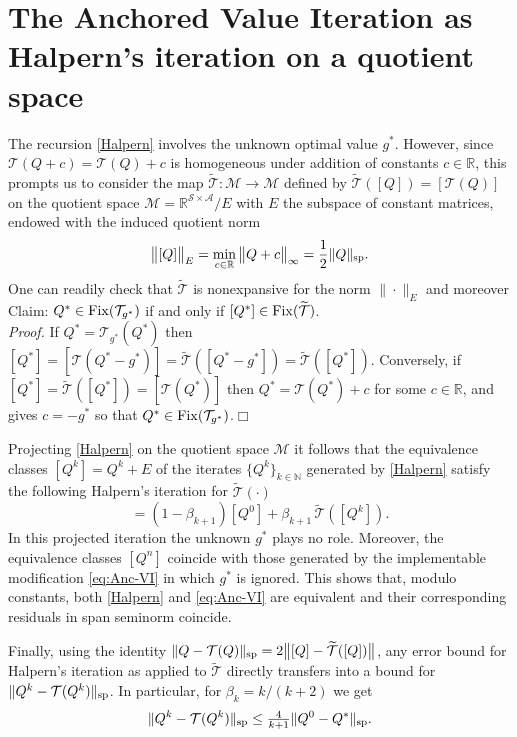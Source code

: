 \documentclass{article}
\newcommand{\cA}{\mathcal{A}}
\newcommand{\cS}{\mathcal{S}}
\newcommand{\T}{\mathcal{T}}
\newcommand{\NN}{\mathbb{N}}
\newcommand{\reals}{\mathbb{R}}
\renewcommand{\sp}[1]{\|{#1}\|_\text{\rm sp}}
\newcommand{\X}{\mathcal{M}}
\newcommand{\Fix}{\mathop{\rm Fix}}
\theoremstyle{plain}
\theoremstyle{definition}
\theoremstyle{remark}
\begin{document}
\section{The Anchored Value Iteration as Halpern's iteration on a quotient space} \label{ap:quotient}
The recursion \eqref{Halpern} involves the unknown optimal value $g^*$.
However, since $\T(Q+c)=\T(Q)+c$ is homogeneous under addition of constants $c\in\reals$, 
this prompts us to consider the map  $\widetilde{\T}:\X\to  \X$ defined by 
$\widetilde{\T}([Q])=[\T(Q)]$ on the quotient space $\X=\reals^{\cS\times\cA}/E$ with $E$ the subspace of constant matrices, endowed with 
the induced quotient norm
$$\big\|[Q]\big\|_E=\min_{c\in\reals}\big\|Q+c\big\|_\infty=\frac{1}{2}\sp{Q}.$$
One can readily check that $\widetilde{\T}$ is nonexpansive for the norm $\|\cdot\|_E$
and moreover\\[1ex]
{\sc Claim:} $Q^*\in\Fix(\T_{g^*})$ if and only if $[Q^*]\in\Fix(\widetilde{\T})$.\\[0.5ex]
{\em Proof.} If  $Q^*=\T_{g^*}(Q^*)$  then $[Q^*]=[\T(Q^*\!-\!g^*)]=\widetilde{\T}([Q^*\!-\!g^*])=\widetilde{\T}([Q^*])$.
Conversely, if $[Q^*]=\widetilde{\T}([Q^*])=[\T(Q^*)]$ then
$Q^*=\T(Q^*)+c$ for some $c\in\reals$, and \citet[Theorem 9.1.2]{10.5555/528623} 
gives $c=-g^*$ so that $Q^*\in\Fix(\T_{g^*})$.\hfill$\Box$

\vspace{1ex}
Projecting \eqref{Halpern} on the quotient space $\X$ it follows that the equivalence classes $[Q^k]=Q^k+E$ of the iterates $\{Q^k\}_{k\in\NN}$ 
generated by \eqref{Halpern} satisfy the following Halpern's iteration for $\widetilde{\T}(\cdot)$
\begin{equation*}
[Q^{k+1}]=(1-\beta_{k+1})[Q^0]+ \beta_{k+1}\, \widetilde{\T}([Q^{k}]).
\end{equation*}
In this projected iteration the unknown $g^*$ plays no role. Moreover, the equivalence classes $[Q^n]$ coincide with those generated by the implementable
modification \eqref{eq:Anc-VI} in which $g^*$ is ignored. 
This shows that, modulo constants, both \eqref{Halpern} and \eqref{eq:Anc-VI} are equivalent and their corresponding residuals in span seminorm coincide.

Finally, using the identity
$\sp{Q-\T(Q)}=2\big\|[Q]-\widetilde{\T}([Q])\big\|$,
any error bound for Halpern's iteration as applied to $\widetilde{\T}$ directly transfers into a  bound for $\sp{Q^k-\T(Q^k)}$. 
In particular, for $\beta_k=k/(k+2)$ we get
$$\sp{Q^k-\T(Q^k)}\leq\mbox{$\frac{4}{k+1}$}\sp{Q^0-Q^*}.$$
\end{document}
